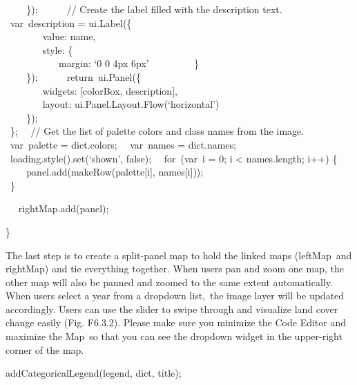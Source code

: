 \documentclass[
  letterpaper,
  DIV=11,
  numbers=noendperiod]{scrreprt}
\begin{document}
\hspace*{0.333em} ~ ~ ~\});~ ~ ~ ~// Create the label filled with the
description text.~ ~ ~ ~var~description = ui.Label(\{\\
\hspace*{0.333em} ~ ~ ~ ~ ~value: name,\\
\hspace*{0.333em} ~ ~ ~ ~ ~style: \{\\
\hspace*{0.333em} ~ ~ ~ ~ ~ ~ ~margin: `0 0 4px 6px'~ ~ ~ ~ ~ ~\}\\
\hspace*{0.333em} ~ ~ ~\});~ ~ ~ ~return~ui.Panel(\{\\
\hspace*{0.333em} ~ ~ ~ ~ ~widgets: {[}colorBox, description{]},\\
\hspace*{0.333em} ~ ~ ~ ~ ~layout: ui.Panel.Layout.Flow(`horizontal')\\
\hspace*{0.333em} ~ ~ ~\});\\
\hspace*{0.333em} ~\};~ ~// Get the list of palette colors and class
names from the image.~ ~var~palette = dict.colors;~ ~var~names =
dict.names;\\
\hspace*{0.333em} ~loading.style().set(`shown', false);~ ~for~(var~i =
0; i \textless{} names.length; i++) \{\\
\hspace*{0.333em} ~ ~ ~panel.add(makeRow(palette{[}i{]},
names{[}i{]}));\\
\hspace*{0.333em} ~\}

~ ~rightMap.add(panel);

\}

The last step is to create a split-panel map to hold the linked maps
(leftMap~and rightMap) and tie everything together. When users pan and
zoom one map, the other map will also be panned and zoomed to the same
extent automatically. When users select a year from a dropdown list,~the
image layer will be updated accordingly. Users can use the slider to
swipe through and visualize land cover change easily (Fig. F6.3.2).
Please make sure you minimize the Code Editor and maximize the Map~so
that you can see the dropdown widget in the upper-right corner of the
map.

addCategoricalLegend(legend, dict, title);
\end{document}
